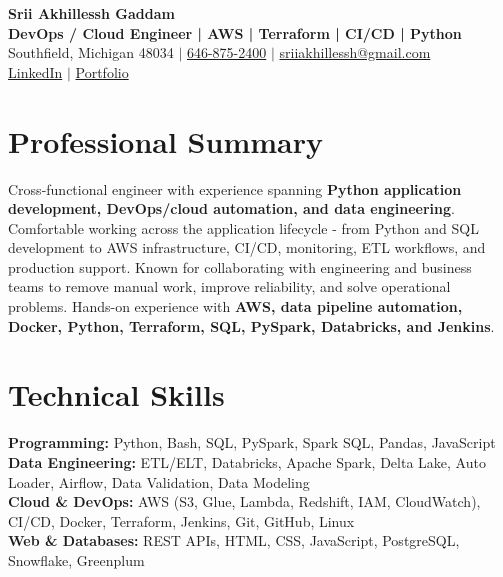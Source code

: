 \documentclass[letterpaper,10pt]{article}
\begin{document}
\fontsize{9.35pt}{10.45pt}\selectfont

\begin{center}
    {\LARGE \textbf{Srii Akhillessh Gaddam}} \\[-1pt]
    \textbf{DevOps / Cloud Engineer | AWS | Terraform | CI/CD | Python} \\[2pt]
    Southfield, Michigan 48034 $|$
    \href{tel:6468752400}{646-875-2400} $|$
    \href{mailto:sriiakhillessh@gmail.com}{sriiakhillessh@gmail.com} \\[1pt]
    \href{https://www.linkedin.com/in/srii-akhiilessh-gaddam-b48668191/}{LinkedIn} $|$
    \href{https://sriiakhillesshg.github.io/portfolio/}{Portfolio}
\end{center}
\vspace{-8pt}

\section{Professional Summary}
\small{Cross-functional engineer with experience spanning \textbf{Python application development, DevOps/cloud automation, and data engineering}. Comfortable working across the application lifecycle - from Python and SQL development to AWS infrastructure, CI/CD, monitoring, ETL workflows, and production support. Known for collaborating with engineering and business teams to remove manual work, improve reliability, and solve operational problems. Hands-on experience with \textbf{AWS, data pipeline automation, Docker, Python, Terraform, SQL, PySpark, Databricks, and Jenkins}.}

\section{Technical Skills}
\small{
\textbf{Programming:} Python, Bash, SQL, PySpark, Spark SQL, Pandas, JavaScript \\
\textbf{Data Engineering:} ETL/ELT, Databricks, Apache Spark, Delta Lake, Auto Loader, Airflow, Data Validation, Data Modeling \\
\textbf{Cloud \& DevOps:} AWS (S3, Glue, Lambda, Redshift, IAM, CloudWatch), CI/CD, Docker, Terraform, Jenkins, Git, GitHub, Linux \\
\textbf{Web \& Databases:} REST APIs, HTML, CSS, JavaScript, PostgreSQL, Snowflake, Greenplum
}
\end{document}
